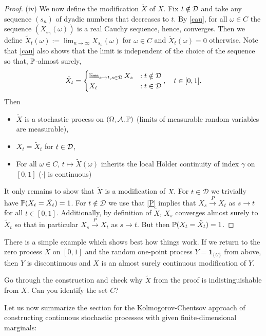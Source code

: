 \begin{proof}[Proof]
		(iv) We now define the modification $\tilde X$ of $X$. Fix $t\notin \cD$ and take any sequence $(s_n)$ of dyadic numbers that decreases to $t$. By \eqref{cau}, for all $\omega\in C$ the sequence $(X_{s_n}(\omega))$ is a real Cauchy sequence, hence, converges. Then we define $\tilde X_t(\omega):=\lim_{n\to\infty}X_{s_n}(\omega)$ for $\omega\in C$ and $\tilde X_t(\omega)=0$ otherwise. Note that \eqref{cau} also shows that the limit is independent of the choice of the sequence so that, $\P$-almost surely,
		\begin{align*}
			\tilde X_t=
			\begin{cases}
				\lim_{s\to t, s\in \cD}X_{s}&: t\notin \cD\\
				X_t&: t\in \cD
			\end{cases},\quad t\in [0,1].
		\end{align*}	
		Then
		\begin{itemize}
			\item $\tilde X$ is a stochastic process on $(\Omega, \mathcal A, \P)$ (limits of measurable random variables are measurable),
			\item $X_t=\tilde X_t$ for $t\in \cD$,
			\item For all $\omega \in C$, $t\mapsto \tilde X(\omega)$ inherits the local H\"older continuity of index $\gamma$ on $[0,1]$ ($\cdot|$ is continuous)
		\end{itemize}
		It only remains to show that $\tilde X$ is a modification of $X$. For $t\in \mathcal D$ we trivially have $\P(X_t=\tilde X_t)=1$. For $t\notin \mathcal D$ we use that \eqref{P} implies that $X_s\overset{P}{\to} X_t$ as $s\to t$ for all $t\in [0,1]$. Additionally, by definition of $\tilde X$, $X_s$ converges almost surely to $\tilde X_t$ so that in particular $X_s\overset{P}{\to} X_t$ as $s\to t$. But then $\P(X_t=\tilde X_t)=1$. 
\end{proof}
There is a simple example which shows best how things work. If we return to the zero process $X$ on $[0,1]$ and the random one-point process $Y=\mathbf 1_{\{U\}}$ from above, then $Y$ is discontinuous and $X$ is an almost surely continuous modification of $Y$. 
\begin{luebung}
	Go through the construction and check why $\tilde X$ from the proof is indistinguishable from $X$. Can you identify the set $C$? \smallskip
\end{luebung}
Let us now summarize the section for the Kolmogorov-Chentsov approach of constructing continuous stochastic processes with given finite-dimensional marginals:

